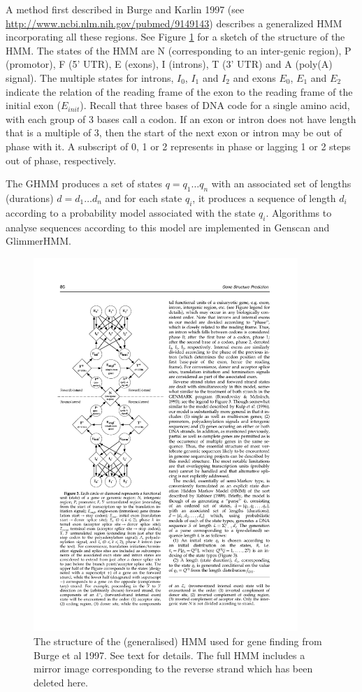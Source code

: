 \documentclass[11pt]{article}
\begin{document}
A method first described in Burge and Karlin 1997 (see \url{http://www.ncbi.nlm.nih.gov/pubmed/9149143}) describes a generalized HMM incorporating all these regions. See Figure \ref{fig:genehmm} for a sketch of the structure of the HMM.  The states of  the HMM are N (corresponding to an inter-genic region), P (promotor), F (5' UTR), E (exons), I (introns), T (3' UTR) and A (poly(A) signal).   The multiple states for  introns, $I_0$, $I_1$ and $I_2$ and exons $E_0$, $E_1$ and $E_2$ indicate the relation of the reading frame of the exon to the reading frame of the initial exon ($E_{init}$).  Recall that three bases of DNA code for a single amino acid, with each group of 3 bases call a codon.  If an exon or intron does not have length that is a multiple of 3, then the start of the next exon or intron may be out of phase with it.  A subscript of 0, 1 or 2 represents in phase or lagging 1 or 2 steps out of phase, respectively.


 
The GHMM produces a set of states $q = q_1\ldots q_n$ with an associated set of lengths (durations) $d = d_1\ldots d_n$ and for each state $q_i$, it produces a sequence of length $d_i$ according to a probability model associated with the state $q_i$.  Algorithms to analyse sequences according to this model are implemented in Genscan and GlimmerHMM. 



\begin{figure}[h]
\includegraphics[width=10cm]{figures/genehmm}
\caption{ The structure of the (generalised) HMM used for gene finding from Burge et al 1997.  See text for details.  The full HMM includes a mirror image corresponding  to the reverse strand which  has been deleted here.  }
\label{fig:genehmm}
\end{figure}
\end{document}
